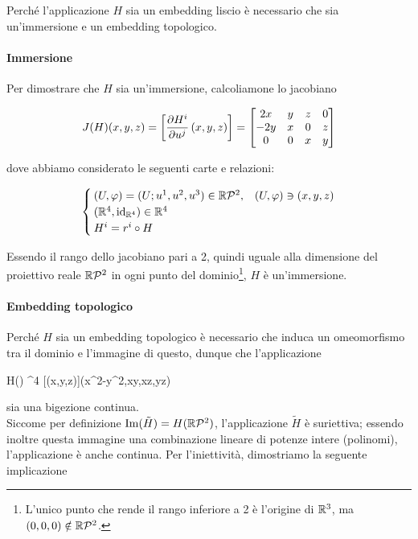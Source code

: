 {Perché l'applicazione $ H $ sia un embedding liscio è necessario che sia un'immersione e un embedding topologico.

\paragraph{Immersione}

Per dimostrare che $ H $ sia un'immersione, calcoliamone lo jacobiano

\begin{equation}
	J(H)(x,y,z) = \left[ \pdv{H^{i}}{u^{j}} \, (x,y,z) \right] %
	= \bmqty{ %
				2 x & y & z & 0 \\ %
				- 2 y & x & 0 & z \\ %
				0 & 0 & x & y %
				}
\end{equation}

dove abbiamo considerato le seguenti carte e relazioni:

\begin{equation}
	\begin{cases}
		(U, \varphi) = (U; u^{1}, u^{2}, u^{3}) \in \mathbb{R}\mathcal{P}^{2}, & (U,\varphi) \ni (x,y,z) \\
		(\mathbb{R}^{4}, \operatorname{id}_{\mathbb{R}^{4}}) \in \mathbb{R}^{4} \\
		H^{i} = r^{i} \circ H
	\end{cases}
\end{equation}

Essendo il rango dello jacobiano pari a 2, quindi uguale alla dimensione del proiettivo reale $ \mathbb{R}\mathcal{P}^{2} $ in ogni punto del dominio\footnote{%
	L'unico punto che rende il rango inferiore a 2 è l'origine di $ \mathbb{R}^{3} $, ma $ (0,0,0) \notin \mathbb{R}\mathcal{P}^{2} $.%
}, $ H $ è un'immersione.

\paragraph{Embedding topologico}

Perché $ H $ sia un embedding topologico è necessario che induca un omeomorfismo tra il dominio e l'immagine di questo, dunque che l'applicazione

	{}{H() \subset \R^{4}}
	{[(x,y,z)]}{(x^{2}-y^{2},xy,xz,yz)}

sia una bigezione continua. \\
Siccome per definizione $ \Im(\tilde{H}) = H(\mathbb{R}\mathcal{P}^{2}) $, l'applicazione $ \tilde{H} $ è suriettiva; essendo inoltre questa immagine una combinazione lineare  di potenze intere (polinomi), l'applicazione è anche continua. Per l'iniettività, dimostriamo la seguente implicazione

}
